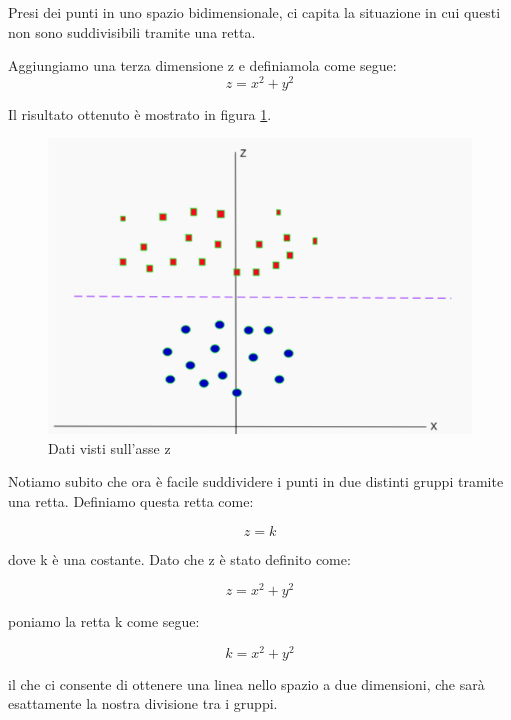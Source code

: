 \documentclass[12pt,italian]{report}
\begin{document}
Presi dei punti in uno spazio bidimensionale, ci capita la situazione in cui questi non sono suddivisibili tramite una retta.

Aggiungiamo una terza dimensione z e definiamola come segue:
\[ z = x^2 + y^2 \]

Il risultato ottenuto è mostrato in figura \ref{fig:svc_on_z_axis}.

\begin{figure}[h!]
	\center
	\includegraphics[scale=0.4]{../img/svc_on_z_axis} %
	\caption{Dati visti sull'asse z}
	\label{fig:svc_on_z_axis}
\end{figure}

Notiamo subito che ora è facile suddividere i punti in due distinti gruppi tramite una retta. Definiamo questa retta come:

\[ z = k \]

dove k è una costante. Dato che z è stato definito come:

\[ z = x^2 + y^2 \]

poniamo la retta k come segue:

\[ k = x^2 + y^2 \]

il che ci consente di ottenere una linea nello spazio a due dimensioni, che sarà esattamente la nostra divisione tra i gruppi.
\end{document}
